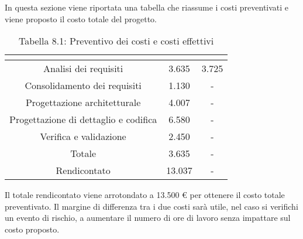 In questa sezione viene riportata una tabella che riassume i costi preventivati e viene proposto il costo totale del progetto.
\\
\renewcommand{\arraystretch}{1.5}
\begin{table}[H]
\begin{center}
\begin{tabular}{|c|c|c|}
\hline
\rowcolor{title_row}
\textbf{\color{title_text}{Periodo}}  & \textbf{\color{title_text}{Preventivo \euro}} & \textbf{\color{title_text}{Consuntivo \euro}} \\ \hline
Analisi dei requisiti   & 3.635 & 3.725 \\ \hline
Consolidamento dei requisiti   & 1.130 & - \\ \hline
Progettazione architetturale    & 4.007 & - \\ \hline
Progettazione di dettaglio e codifica    & 6.580 & - \\ \hline
Verifica e validazione    & 2.450 & - \\ \hline
Totale   & 3.635 & - \\ \hline
Rendicontato   & 13.037 & - \\ \hline
\end{tabular}
\caption{Tabella 8.1: Preventivo dei costi e costi effettivi\label{}}
\end{center}
\end{table}
\renewcommand{\arraystretch}{1}

Il totale rendicontato viene arrotondato a 13.500 \euro{}  per ottenere il costo totale preventivato.  
Il margine di differenza tra i due costi sarà utile, nel caso si verifichi un evento di rischio, a aumentare
il numero di ore di lavoro senza impattare sul costo proposto.

\pagebreak
